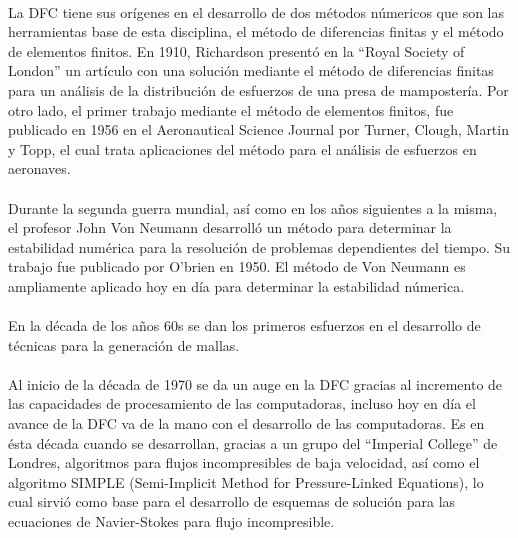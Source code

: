 \documentclass[letterpaper, openright, 12pt]{book}
\begin{document}
    \paragraph*{}
    La DFC tiene sus orígenes en el desarrollo de dos métodos
    númericos que son las herramientas base de esta disciplina,
    el método de diferencias finitas y el método de elementos
    finitos. En 1910, Richardson presentó en la ``Royal Society of
    London'' un artículo con una solución mediante el método de
    diferencias finitas para un análisis de la distribución de
    esfuerzos de una presa de mampostería. Por otro lado, el primer
    trabajo mediante el método de elementos finitos, fue publicado
    en 1956 en el Aeronautical Science Journal por Turner, Clough,
    Martin y Topp, el cual trata aplicaciones del método para el
    análisis de esfuerzos en aeronaves.\cite{tj-chung}

    \paragraph*{}
    Durante la segunda guerra mundial, así como en los años siguientes
    a la misma, el profesor John Von Neumann desarrolló un método
    para determinar la estabilidad numérica para la resolución de
    problemas dependientes del tiempo. Su trabajo fue publicado por
    O'brien en 1950. El método de Von Neumann es ampliamente
    aplicado hoy en día para determinar la estabilidad
    númerica.\cite{pletcher-CFD-HeatTransfer}

    \paragraph*{}
    En la década de los años 60s se dan los primeros esfuerzos en el
    desarrollo de técnicas para la generación de mallas.\cite{liseikin1999grid}

    \paragraph*{}
    Al inicio de la década de 1970 se da un auge en la DFC gracias
    al incremento de las capacidades de procesamiento de las
    computadoras, incluso hoy en día el avance de la DFC va de la
    mano con el desarrollo de las computadoras.\cite{blazek} Es en
    ésta década cuando se desarrollan, gracias a un grupo del
    ``Imperial College'' de Londres, algoritmos para flujos
    incompresibles de baja velocidad, así como el algoritmo SIMPLE
    (Semi-Implicit Method for Pressure-Linked Equations), lo cual
    sirvió como base para el desarrollo de esquemas de solución para
    las ecuaciones de Navier-Stokes para flujo
    incompresible.\cite{pletcher-CFD-HeatTransfer}
\end{document}
